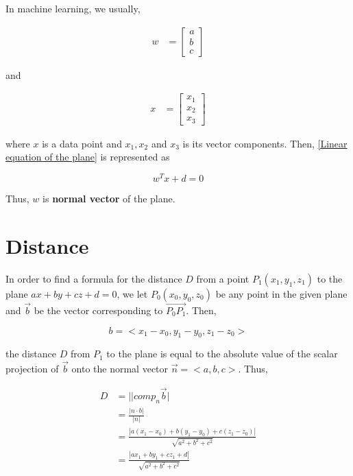 In machine learning, we usually,

\begin{align}
    w &= \begin{bmatrix}
           a \\
           b \\
           c
         \end{bmatrix}
\end{align}

and

\begin{align}
    x &= \begin{bmatrix}
           x_1 \\
           x_2 \\
           x_3
         \end{bmatrix}
  \end{align}

where $x$ is a data point and $x_1, x_2$ and $x_3$ is its vector components. Then, \ref{Linear equation of the plane} is represented as

\begin{equation}
    w^Tx + d = 0    
\end{equation}

Thus, $w$ is \textbf{normal vector} of the plane.

\section{Distance}

In order to find a formula for the distance $D$ from a point $P_1(x_1, y_1, z_1)$ to the plane $ax + by + cz + d = 0$, we let $P_0(x_0, y_0, z_0)$ be any point in the given plane and $\vec{b}$ be the vector corresponding to $\vec{P_0P_1}$. Then,

\begin{equation}
    b = <x_1 - x_0, y_1 - y_0, z_1 - z_0>
\end{equation}

the distance $D$ from $P_1$ to the plane is equal to the absolute value of the scalar projection of $\vec{b}$ onto the normal vector $\vec{n} = <a, b, c>$. Thus,

\begin{equation}
    \begin{split}
        D & = ||comp_n\vec{b}|\\
          & = \frac{|n \cdot b|}{|n|}\\
          & = \frac{|a(x_1 - x_0) + b(y_1 - y_0) + c(z_1 - z_0)|}{\sqrt{a^2 + b^2 + c^2}}\\
          & = \frac{|ax_1 + by_1 + cz_1 + d|}{\sqrt{a^2 + b^2 + c^2}}
    \end{split}
\end{equation}

